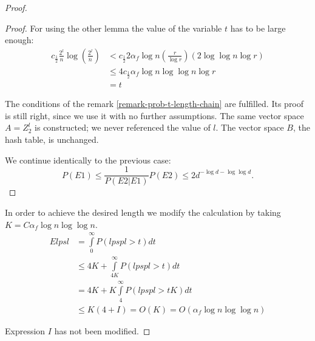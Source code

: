 \begin{proof}
\begin{proof}
For using the other lemma the value of the variable $t$ has to be large enough:
\begin{displaymath}
\begin{split}
c_{\frac{1}{2}} \frac{2^l}{n} \log \left(\frac{2^l}{n}\right) 
	& < c_{\frac{1}{2}} 2 \alpha_f \log n \left( \frac{r}{\log r} \right) \left(2 \log \log n \log r \right) \\
	& \leq 4 c_{\frac{1}{2}} \alpha_f \log n \log \log n \log r \\
	& = t
\end{split}
\end{displaymath}

The conditions of the remark \ref{remark-prob-t-length-chain} are fulfilled. Its proof is still right, since we use it with no further assumptions. The same vector space $A = Z_2^l$ is constructed; we never referenced the value of $l$. The vector space $B$, the hash table, is unchanged.

We continue identically to the previous case:
\begin{displaymath}
P(E1) \leq \frac{1}{P(E2|E1)}P(E2) \leq 2 d ^ {-\log d - \log \log d}\textit{.}
\end{displaymath}
\end{proof}

In order to achieve the desired length we modify the calculation by taking $K = C \alpha_f \log n \log \log n$.
\begin{displaymath}
\begin{split}
E lpsl 
	& = \int\limits_0^\infty P(lpspl > t) dt \\
	& \leq 4K + \int\limits_{4K}^\infty P(lpspl > t) dt \\
	& = 4K + K\int\limits_4^\infty P(lpspl > tK) dt \\
	& \leq K(4 + I) = O(K) = O(\alpha_f \log n \log \log n)
\end{split}
\end{displaymath}

Expression $I$ has not been modified.
\end{proof}